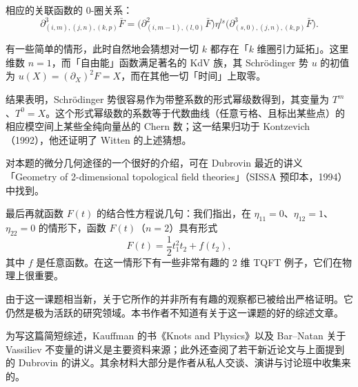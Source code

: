 
相应的关联函数的 0-圈关系：
\[
\partial^3_{(i,m),(j,n),(k,p)}\bar F=\bigl(\partial^2_{(i,m-1),(l,0)}\bar F\bigr)\eta^{ls}\bigl(\partial^3_{(s,0),(j,n),(k,p)}\bar F\bigr).
\]


有一些简单的情形，此时自然地会猜想对一切 $k$ 都存在「$k$ 维圈引力延拓」。这里维数 $n=1$，而「自由能」函数满足著名的 KdV 族，其 Schrödinger 势 $u$ 的初值为 $u(X)=(\partial_X)^2F=X$，而在其他一切「时间」上取零。

结果表明，Schrödinger 势很容易作为带整系数的形式幂级数得到，其变量为 $T^m$、$T^0=X$。这个形式幂级数的系数等于代数曲线（任意亏格、且标出某些点）的相应模空间上某些全纯向量丛的 Chern 数；这一结果归功于 Kontzevich（1992），他还证明了 Witten 的上述猜想。

对本题的微分几何途径的一个很好的介绍，可在 Dubrovin 最近的讲义「Geometry of 2-dimensional topological field theories」（SISSA 预印本，1994）中找到。

最后再就函数 $F(t)$ 的结合性方程说几句：我们指出，在 $\eta_{11}=0$、$\eta_{12}=1$、$\eta_{22}=0$ 的情形下，函数 $F(t)$（$n=2$）具有形式
\[
F(t)=\frac12t_1^2t_2+f(t_2),
\]
其中 $f$ 是任意函数。在这一情形下有一些非常有趣的 2 维 TQFT 例子，它们在物理上很重要。

由于这一课题相当新，关于它所作的并非所有有趣的观察都已被给出严格证明。它仍然是极为活跃的研究领域。本书作者不知道有关于这一课题的好的综述文章。

为写这篇简短综述，Kauffman 的书《Knots and Physics》以及 Bar--Natan 关于 Vassiliev 不变量的讲义是主要资料来源；此外还查阅了若干新近论文与上面提到的 Dubrovin 的讲义。其余材料大部分是作者从私人交谈、演讲与讨论班中收集来的。

